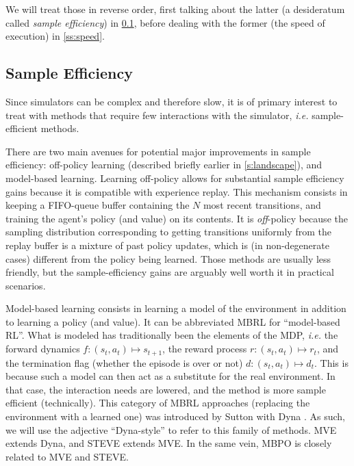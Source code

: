 \documentclass[12pt,a4paper]{article}
\begin{document}
We will treat those in reverse order, first talking
about the latter (a desideratum called \textit{sample efficiency}) in \ref{ss:efficiency},
before dealing with the former (the speed of execution) in \ref{ss:speed}.

\subsection{Sample Efficiency}
\label{ss:efficiency}

Since simulators can be complex and therefore slow,
it is of primary interest to treat with methods
that require few interactions with the simulator,
\textit{i.e.} sample-efficient methods.

There are two main avenues for potential major improvements in sample efficiency:
off-policy learning (described briefly earlier in \ref{s:landscape}),
and model-based learning.
Learning off-policy allows for substantial sample efficiency gains because it is compatible
with experience replay. This mechanism consists in keeping a FIFO-queue buffer containing the
$N$ most recent transitions, and training the agent's policy (and value) on its contents.
It is \textit{off}-policy because the sampling distribution corresponding to getting transitions
uniformly from the replay buffer is a mixture of past policy updates, which is (in non-degenerate
cases) different from the policy being learned. Those methods are usually less friendly, but the
sample-efficiency gains are arguably well worth it in practical scenarios.

Model-based learning consists in learning a model of the environment in addition to learning
a policy (and value). It can be abbreviated MBRL for ``model-based RL''. What is modeled has
traditionally been the elements of the MDP, \textit{i.e.}
the forward dynamics $f: (s_t, a_t) \mapsto s_{t+1}$,
the reward process $r: (s_t, a_t) \mapsto r_t$,
and the termination flag (whether the episode is over or not) $d: (s_t, a_t) \mapsto d_t$.
This is because such a model can then act as a substitute for the real environment.
In that case, the interaction needs are lowered, and the method is more sample efficient
(technically). This category of MBRL approaches (replacing the environment with a learned one)
was introduced by Sutton with Dyna \cite{Sutton1991-cp}.
As such, we will use the adjective ``Dyna-style'' to refer to this family of methods.
MVE \cite{Feinberg2018-tv} extends Dyna, and
STEVE \cite{Buckman2018-jd} extends MVE.
In the same vein, MBPO \cite{Janner2019-sk} is closely related to MVE and STEVE.
\end{document}
